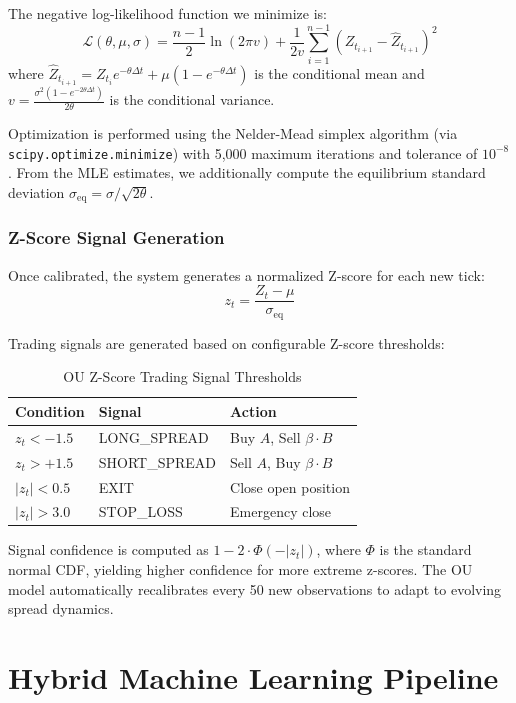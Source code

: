 \documentclass[letterpaper,11pt]{report}
\begin{document}
The negative log-likelihood function we minimize is:
$$\mathcal{L}(\theta, \mu, \sigma) = \frac{n-1}{2}\ln(2\pi v) + \frac{1}{2v}\sum_{i=1}^{n-1}(Z_{t_{i+1}} - \hat{Z}_{t_{i+1}})^2$$
where $\hat{Z}_{t_{i+1}} = Z_{t_i} e^{-\theta\Delta t} + \mu(1 - e^{-\theta\Delta t})$ is the conditional mean and $v = \frac{\sigma^2(1 - e^{-2\theta\Delta t})}{2\theta}$ is the conditional variance.

Optimization is performed using the Nelder-Mead simplex algorithm (via \texttt{scipy.optimize.minimize}) with 5,000 maximum iterations and tolerance of $10^{-8}$. From the MLE estimates, we additionally compute the equilibrium standard deviation $\sigma_{\text{eq}} = \sigma / \sqrt{2\theta}$.

\subsection{Z-Score Signal Generation}

Once calibrated, the system generates a normalized Z-score for each new tick:
$$z_t = \frac{Z_t - \mu}{\sigma_{\text{eq}}}$$

Trading signals are generated based on configurable Z-score thresholds:

\begin{table}[h]
\centering
\caption{OU Z-Score Trading Signal Thresholds}
\begin{tabular}{lll}
\toprule
\textbf{Condition} & \textbf{Signal} & \textbf{Action} \\
\midrule
$z_t < -1.5$ & LONG\_SPREAD & Buy $A$, Sell $\beta \cdot B$ \\
$z_t > +1.5$ & SHORT\_SPREAD & Sell $A$, Buy $\beta \cdot B$ \\
$|z_t| < 0.5$ & EXIT & Close open position \\
$|z_t| > 3.0$ & STOP\_LOSS & Emergency close \\
\bottomrule
\end{tabular}
\end{table}

Signal confidence is computed as $1 - 2 \cdot \Phi(-|z_t|)$, where $\Phi$ is the standard normal CDF, yielding higher confidence for more extreme z-scores. The OU model automatically recalibrates every 50 new observations to adapt to evolving spread dynamics.


\chapter{Hybrid Machine Learning Pipeline}
\end{document}
